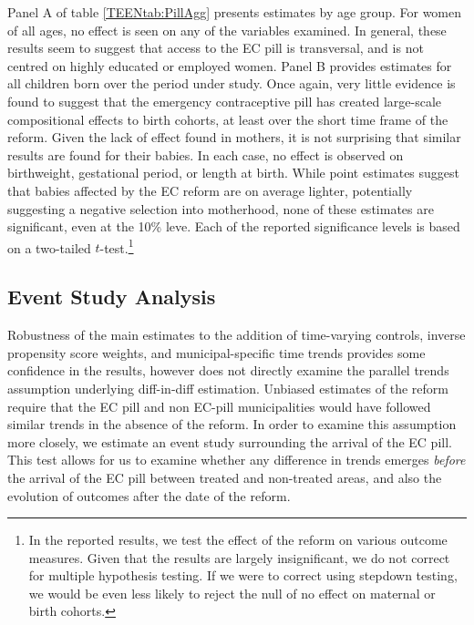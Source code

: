 Panel A of table \ref{TEENtab:PillAgg} presents estimates by age group.  For
women of all ages, no effect is seen on any of the variables examined. In
general, these results seem to suggest that access to the EC pill is transversal,
and is not centred on highly educated or employed women. Panel B provides
estimates for all children born over the period under study.  Once again, very
little evidence is found to suggest that the emergency 
contraceptive pill has created large-scale compositional effects to birth
cohorts, at least over the short time frame of the reform.  Given the lack of 
effect found in mothers, it is not surprising that similar results are found 
for their babies. In each case, no effect is observed on birthweight, 
gestational period, or length at birth.  While point estimates suggest that
babies affected by the EC reform are on average lighter, potentially suggesting
a negative selection into motherhood, none of these estimates are significant,
even at the 10\% leve.  Each of the reported significance levels is based on a
two-tailed $t$-test.\footnote{In the reported results, we test the effect of the
reform on various outcome measures.  Given that the results are largely
insignificant, we do not correct for multiple hypothesis testing.  If we were to
correct using stepdown testing, we would be even less likely to reject the null
of no effect on maternal or birth cohorts.}  

\subsection{Event Study Analysis}
\label{TEENsscn:eventstudy}
Robustness of the main estimates to the addition of time-varying controls, 
inverse propensity score weights, and municipal-specific time trends provides 
some confidence in the results, however does not directly examine the
parallel trends assumption underlying diff-in-diff estimation.  Unbiased 
estimates of the reform require that the EC pill and non EC-pill municipalities 
would have followed similar trends in the absence of the reform.  In order to 
examine this assumption more closely, we estimate an event study surrounding the 
arrival of the EC pill.  This test allows for us to examine whether any 
difference in trends emerges \emph{before} the arrival of the EC pill between 
treated and non-treated areas, and also the evolution of outcomes after the date 
of the reform.

